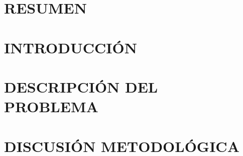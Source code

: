 \documentclass[pdftex]{pucthesis}	%
\begin{document}


\tableofcontents
{} \label{listoffigures}
\listoffigures
{} \label{listoftables}
\listoftables
\cleardoublepage



 \label{resumen}
\chapter*{RESUMEN}

\cleardoublepage



\par\bigskip     
\begingroup 
\let\clearpage\relax  
\chapter[INTRODUCCIÓN]{INTRODUCCIÓN}

\endgroup

\par\bigskip     
\begingroup 
\let\clearpage\relax  
\chapter[DESCRIPCIÓN DEL PROBLEMA]{DESCRIPCIÓN DEL PROBLEMA} \label{ch1}

\endgroup

\par\bigskip     
\begingroup
\let\clearpage\relax  
\chapter[DISCUSIÓN METODOLÓGICA]{DISCUSIÓN METODOLÓGICA} \label{ch2}

\endgroup

\par\bigskip     
\begingroup
\let\clearpage\relax  
\end{document}
